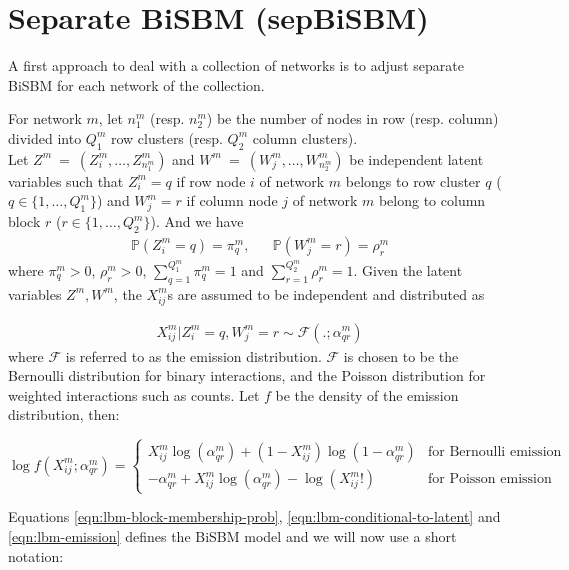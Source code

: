 \documentclass[12pt,a4paper]{report}
\begin{document}
\section{Separate BiSBM (sepBiSBM)}\label{sec:separate-bisbm-sepbisbm}

A first approach to deal with a collection of networks is to adjust separate
BiSBM for each network of the collection.

For network $m$, let $n_1^m$ (resp. $n_2^m$) be the number of nodes in row
(resp. column) divided into $Q_1^m$ row clusters (resp. $Q_2^m$ column
clusters).\\
Let $Z^m~=~(Z^m_i, \dots, Z^m_{n_1^m})$ and $W^m~=~(W^m_j, \dots, W^m_{n_2^m})$
be independent latent variables such that $Z^m_i = q$ if row node $i$ of network
$m$ belongs to row cluster $q$ ($q\in\{1,\dots,Q_1^m\}$) and $W^m_j = r$ if column node $j$ of network $m$
belong to column block $r$ ($r\in\{1,\dots,Q_2^m\}$). And we have
\begin{align}\label{eqn:lbm-block-membership-prob}
    \mathbb{P}(Z_i^m=q)=\pi_q^m,&&\mathbb{P}(W_j^m=r)=\rho_r^m
\end{align}
where $\pi_q^m > 0$, $\rho_r^m > 0$, $\sum_{q=1}^{Q_1^m}\pi_q^m = 1$ and
$\sum_{r=1}^{Q_2^m}\rho_r^m = 1$. Given the latent variables
$Z^m, W^m$, the $X_{ij}^m$s are assumed to be independent and distributed
as

\begin{align}\label{eqn:lbm-conditional-to-latent}
    X_{ij}^m|Z_i^m = q,W_j^m = r \sim \mathcal{F}(.;\alpha_{qr}^m)
\end{align}
where $\mathcal{F}$ is referred to as the emission distribution. $\mathcal{F}$ is chosen to
be the Bernoulli distribution for binary interactions, and the Poisson
distribution for weighted interactions such as counts. Let $f$ be the density of
the emission distribution, then:

\begin{equation}\label{eqn:lbm-emission}
    \log f(X^m_{ij};\alpha_{qr}^m) =
    \begin{cases}
        X_{ij}^m \log(\alpha_{qr}^m) + (1-X_{ij}^m) \log(1-\alpha_{qr}^m) & \text{for Bernoulli emission} \\
        -\alpha_{qr}^m + X_{ij}^m \log(\alpha_{qr}^m) - \log(X_{ij}^m!) & \text{for Poisson emission}
    \end{cases}
\end{equation}

Equations \eqref{eqn:lbm-block-membership-prob}, \eqref{eqn:lbm-conditional-to-latent}
and \eqref{eqn:lbm-emission} defines the BiSBM model and we will now use a short
notation:
\end{document}
